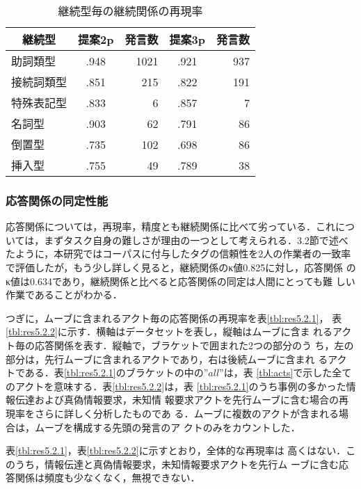 \begin{table}[tbt]
\small
  \begin{center}
    \caption{継続型毎の継続関係の再現率}
    \label{tbl:cont_2_inve5.2}
    \begin{tabular}{|l|c|r||c|r|}
      \hline
      \multicolumn{1}{|c|}{継続型} & 提案2p & 発言数& 提案3p & 発言数\\
      \hline
      助詞類型 &.948& 1021&.921&937\\
      接続詞類型  &.851& 215&.822&191\\
      特殊表記型  &.833& 6&.857&7\\
      名詞型  &.903& 62&.791&86\\
      倒置型  &.735& 102&.698&86\\
      挿入型  &.755& 49&.789&38\\
     \hline
   \end{tabular}
  \end{center}
\end{table}

\subsubsection{応答関係の同定性能}

応答関係については，再現率，精度とも継続関係に比べて劣っている．これにつ
いては，まずタスク自身の難しさが理由の一つとして考えられる．3.2節で述べ
たように，本研究ではコーパスに付与したタグの信頼性を2人の作業者の一致率
で評価したが，もう少し詳しく見ると，継続関係のκ値0.825に対し，応答関係
のκ値は0.634であり，継続関係と比べると応答関係の同定は人間にとっても難
しい作業であることがわかる．

つぎに，ムーブに含まれるアクト毎の応答関係の再現率を表\ref{tbl:res5.2.1}，
表\ref{tbl:res5.2.2}に示す．横軸はデータセットを表し，縦軸はムーブに含ま
れるアクト毎の応答関係を表す．縦軸で，ブラケットで囲まれた2つの部分のう
ち，左の部分は，先行ムーブに含まれるアクトであり，右は後続ムーブに含まれ
るアクトである．表\ref{tbl:res5.2.1}のブラケットの中の”$all$”は，表
\ref{tbl:acts}で示した全てのアクトを意味する．表\ref{tbl:res5.2.2}は，表
\ref{tbl:res5.2.1}のうち事例の多かった情報伝達および真偽情報要求，未知情
報要求アクトを先行ムーブに含む場合の再現率をさらに詳しく分析したものであ
る．ムーブに複数のアクトが含まれる場合は，ムーブを構成する先頭の発言のア
クトのみをカウントした．

表\ref{tbl:res5.2.1}，表\ref{tbl:res5.2.2}に示すとおり，全体的な再現率は
高くはない．このうち，情報伝達と真偽情報要求，未知情報要求アクトを先行ム
ーブに含む応答関係は頻度も少なくなく，無視できない．

